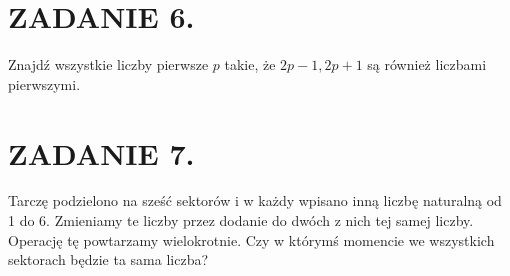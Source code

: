 \documentclass[10pt]{article}
\begin{document}
\section*{ZADANIE 6.}
Znajdź wszystkie liczby pierwsze \(p\) takie, że \(2 p-1,2 p+1\) są również liczbami pierwszymi.

\section*{ZADANIE 7.}
Tarczę podzielono na sześć sektorów i w każdy wpisano inną liczbę naturalną od 1 do 6. Zmieniamy te liczby przez dodanie do dwóch z nich tej samej liczby. Operację tę powtarzamy wielokrotnie. Czy w którymś momencie we wszystkich sektorach będzie ta sama liczba?
\end{document}
